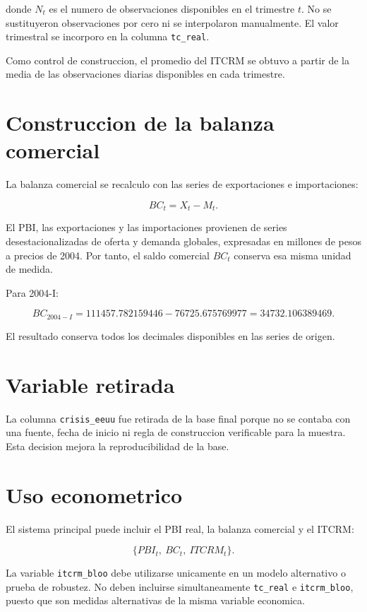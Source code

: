 \documentclass[12pt,a4paper]{article}
\begin{document}
donde $N_t$ es el numero de observaciones disponibles en el trimestre $t$.
No se sustituyeron observaciones por cero ni se interpolaron manualmente.
El valor trimestral se incorporo en la columna \texttt{tc\_real}.

Como control de construccion, el promedio del ITCRM se obtuvo a partir de la
media de las observaciones diarias disponibles en cada trimestre.

\section{Construccion de la balanza comercial}

La balanza comercial se recalculo con las series de exportaciones e
importaciones:

\[
BC_t=X_t-M_t.
\]

El PBI, las exportaciones y las importaciones provienen de series
desestacionalizadas de oferta y demanda globales, expresadas en millones de
pesos a precios de 2004. Por tanto, el saldo comercial $BC_t$ conserva esa
misma unidad de medida.

Para 2004-I:

\[
BC_{2004-I}
=111457.782159446-76725.675769977
=34732.106389469.
\]

El resultado conserva todos los decimales disponibles en las series de origen.

\section{Variable retirada}

La columna \texttt{crisis\_eeuu} fue retirada de la base final porque no se
contaba con una fuente, fecha de inicio ni regla de construccion verificable
para la muestra. Esta decision mejora la reproducibilidad de la base.

\section{Uso econometrico}

El sistema principal puede incluir el PBI real, la balanza comercial y el
ITCRM:

\[
\{PBI_t,\ BC_t,\ ITCRM_t\}.
\]

La variable \texttt{itcrm\_bloo} debe utilizarse unicamente en un modelo
alternativo o prueba de robustez. No deben incluirse simultaneamente
\texttt{tc\_real} e \texttt{itcrm\_bloo}, puesto que son medidas alternativas de
la misma variable economica.
\end{document}
